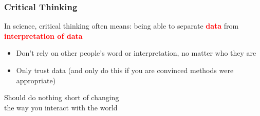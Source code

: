 \documentclass[10pt]{beamer}
\begin{document}
\begin{frame}[t]
\frametitle{Critical Thinking}
\vspace{0.5cm}

	In science, critical thinking often means: being able to separate \textcolor{red}{\textbf{data}} from \textcolor{red}{\textbf{interpretation of data}}
	
		\medskip
		\begin{itemize}
			\item Don't rely on other people's word or interpretation, no matter who they are
			\medskip
			\item Only trust data (and only do this if you are convinced methods were appropriate)
		\end{itemize} 

	\vspace{0.5cm}
	
	\begin{center}
		\textcolor{myblue}{Should do nothing short of changing\\ the way you interact with the world}
	\end{center}
\end{frame}
\end{document}
